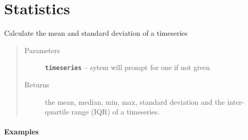 \documentclass[letterpaper,10pt,english]{sphinxmanual}
\begin{document}
\section{Statistics}
\label{Main:statistics}

\begin{fulllineitems}
\label{Main:pyleoclim.statsTs}
Calculate the mean and standard deviation of a timeseries
\begin{quote}\begin{description}
\item[{Parameters}] \leavevmode
\textbf{\texttt{timeseries}} -- sytem will prompt for one if not given

\item[{Returns}] \leavevmode
the mean, median, min, max, standard deviation and the
inter-quartile range (IQR) of a timeseries.

\end{description}\end{quote}
\paragraph{Examples}


\end{fulllineitems}
\end{document}
